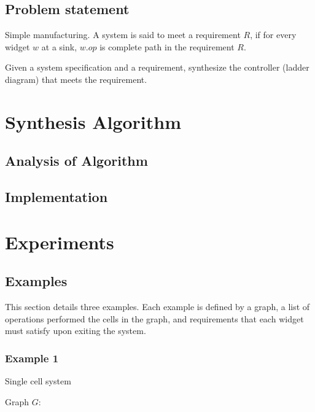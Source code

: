 \documentclass[9pt,conference, compsocconf]{IEEEtran}
\begin{document}
\subsection{Problem statement}
\label{sec:problem}
Simple manufacturing.
A system is said to meet a requirement $R$, if for every widget $w$ at a sink, $\mathit{w.op}$ is complete path in the requirement $R$. 

Given a system specification and a requirement, synthesize the controller (ladder diagram) that meets the requirement.

\section{Synthesis Algorithm}
\label{sec:algo}

\subsection{Analysis of Algorithm}

\subsection{Implementation}


\section{Experiments}
\label{sec:experiments}

\subsection{Examples}
\label{sec:examples}
This section details three examples. Each example is defined by a graph, a list of operations performed the cells in the graph, and requirements that each widget must satisfy upon exiting the system.

\subsubsection{Example 1} Single cell system
\label{sec:example1}

	Graph $G$:
	\begin{center}
	\end{center}
\end{document}
